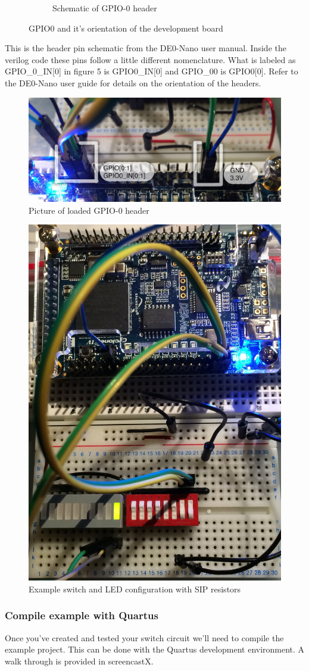 \begin{figure}
\begin{subfigure}[b]{.45\textwidth}
            \caption{Schematic of GPIO-0 header\cite{DE0Manual}}
          \end{subfigure}
          \caption{GPIO0 and it's orientation of the development board}
          \label{pinmap}
        \end{figure}
        This is the header pin schematic from the DE0-Nano user manual. Inside the verilog code these pins follow a little different nomenclature. What is labeled as GPIO\_0\_IN[0] in figure 5 is GPIO0\_IN[0] and GPIO\_00 is GPIO0[0]. Refer to the DE0-Nano user guide for details on the orientation of the headers.

        \begin{figure}[htpb]
          \includegraphics[width=.45\textwidth]{Images/GPIOpicture.jpg}
          \caption{Picture of loaded GPIO-0 header}
        \end{figure}

        \begin{figure}[htpb]
          \includegraphics[width=.48\textwidth]{Images/ExampleLayout.jpg}
          \caption{Example switch and LED configuration with SIP resistors}
        \end{figure}

      \subsubsection{Compile example with Quartus}
        Once you've created and tested your switch circuit we'll need to compile the example project. This can be done
        with the Quartus development environment. A walk through is provided in screencastX. 

